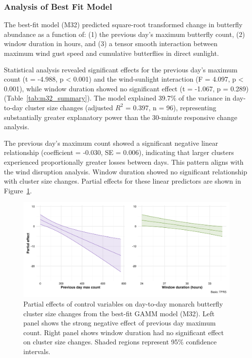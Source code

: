 

\subsubsection{Analysis of Best Fit Model}

The best-fit model (M32) predicted square-root transformed change in butterfly abundance as a function of: (1) the previous day's maximum butterfly count, (2) window duration in hours, and (3) a tensor smooth interaction between maximum wind gust speed and cumulative butterflies in direct sunlight.

Statistical analysis revealed significant effects for the previous day's maximum count (t = -4.988, p < 0.001) and the wind-sunlight interaction (F = 4.097, p < 0.001), while window duration showed no significant effect (t = -1.067, p = 0.289) (Table~\ref{tab:m32_summary}). The model explained 39.7\% of the variance in day-to-day cluster size changes (adjusted $R^2$ = 0.397, n = 96), representing substantially greater explanatory power than the 30-minute responsive change analysis.



The previous day's maximum count showed a significant negative linear relationship (coefficient = -0.030, SE = 0.006), indicating that larger clusters experienced proportionally greater losses between days. This pattern aligns with the wind disruption analysis. Window duration showed no significant relationship with cluster size changes. Partial effects for these linear predictors are shown in Figure~\ref{fig:partial_effects_sunset}.

\begin{figure}[htbp]
    \centering
    \includegraphics[width=\textwidth]{supplemental/results/sunset/figures/partial_effects_best_1x2.png}
    \caption{Partial effects of control variables on day-to-day monarch butterfly cluster size changes from the best-fit GAMM model (M32). Left panel shows the strong negative effect of previous day maximum count. Right panel shows window duration had no significant effect on cluster size changes. Shaded regions represent 95\% confidence intervals.}
    \label{fig:partial_effects_sunset}
\end{figure}


